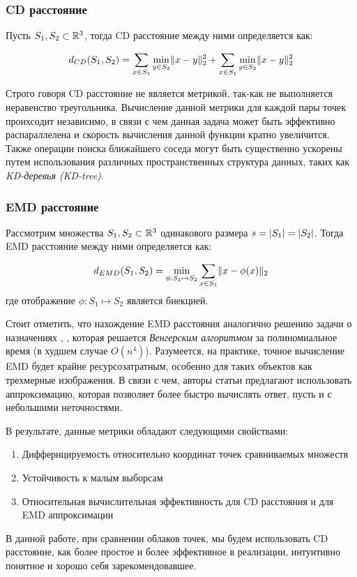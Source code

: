 \subsubsection{CD расстояние}

Пусть \(S_{1}, S_{2} \subset \mathbb{R}^3\), тогда CD расстояние между ними определяется как:

\[
	d_{CD}(S_{1}, S_{2}) = \sum\limits_{x \in S_{1}} \min\limits_{y \in S_{2}} \lVert x - y\rVert_{2}^{2} + \sum\limits_{x \in S_{1}} \min\limits_{y \in S_{2}} \lVert x - y\rVert_{2}^{2}
\]

\medskip
Строго говоря CD расстояние не является метрикой, так-как не выполняется неравенство треугольника. Вычисление данной метрики для каждой пары точек проихсодит независимо, в связи с чем данная задача может быть эффективно распараллелена и скорость вычисления данной функции кратно увеличится. Также операции поиска ближайшего соседа могут быть существенно ускорены путем использования различных пространственных структура данных, таких как \textit{KD-деревья (KD-tree)}. 

\subsubsection{EMD расстояние}

Рассмотрим множества \(S_{1}, S_{2} \subset \mathbb{R}^3\) одинакового размера \(s = \lvert S_{1}\rvert = \lvert S_{2}\rvert\). Тогда EMD расстояние между ними определяется как:

\[
	d_{EMD}(S_{1}, S_{2}) = \min\limits_{\phi:S_{1} \mapsto S_{2}} \sum\limits_{x \in S_{1}} \lVert x - \phi(x)\rVert_{2}
\] где отображение \(\phi:S_{1} \mapsto S_{2}\) является биекцией.


Стоит отметить, что нахождение EMD расстояния аналогично решению задачи о назначениях \cite{assignment-task-1}, \cite{assignment-task-2}, которая решается \textit{Венгерским алгоритмом}\cite{hungarian-alg} за полиномиальное время (в худшем случае $O(n^4)$). Разумеется, на практике, точное вычисление EMD будет крайне ресурсозатратным, особенно для таких объектов как трехмерные изображения. В связи с чем, авторы статьи \cite{metrics-source} предлагают использовать аппроксимацию, которая позволяет более быстро вычислять ответ, пусть и с небольшими неточностями. 

\bigskip
В результате, данные метрики обладают следующими свойствами:
\begin{enumerate}
\item Диффернцируемость относительно координат точек сравниваемых множеств
\item Устойчивость к малым выборсам
\item Относительная вычислительная эффективность для CD расстояния и для EMD аппроксимации
\end{enumerate}



В данной работе, при сравнении облаков точек, мы будем использовать CD расстояние, как более простое и более эффективное в реализации, интуитивно понятное и хорошо себя зарекомендовавшее.

